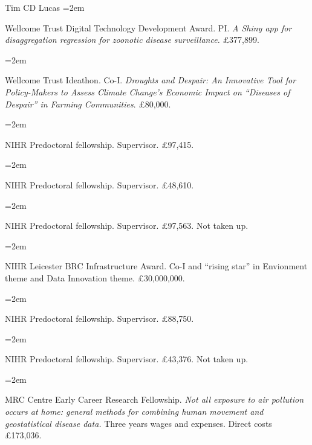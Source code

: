 \documentclass{scrartcl}
\newcommand{\MarginText}[1]{\marginpar{\raggedleft\itshape\small#1}} %
\newcommand{\Description}[1]{\hangindent=2em\hangafter=0\noindent\raggedright\footnotesize{#1}\par\normalsize\vspace{1em}} %
\begin{document}
\begin{cv}{Tim {\Large CD} Lucas}
\Description{\MarginText{2023}Wellcome Trust Digital Technology Development Award. PI. \emph{A Shiny app for disaggregation regression for zoonotic disease surveillance.} £377,899.}
\vspace{-0.5em} %


\Description{Wellcome Trust Ideathon. Co-I. \emph{Droughts and Despair: An Innovative Tool for Policy-Makers to Assess Climate Change's Economic Impact on ``Diseases of Despair'' in Farming Communities}. £80,000.}
\vspace{-0.5em} %

\Description{NIHR Predoctoral fellowship. Supervisor. £97,415.}
\vspace{-0.5em} %

\Description{NIHR Predoctoral fellowship. Supervisor. £48,610.}
\vspace{-0.5em} %

\Description{NIHR Predoctoral fellowship. Supervisor. £97,563. Not taken up.}
\vspace{-0.5em} %

\Description{\MarginText{2022}NIHR Leicester BRC Infrastructure Award. Co-I and ``rising star'' in Envionment theme and Data Innovation theme. £30,000,000.}
\vspace{-0.5em} %


\Description{NIHR Predoctoral fellowship. Supervisor. £88,750.}
\vspace{-0.5em} %

\Description{NIHR Predoctoral fellowship. Supervisor. £43,376. Not taken up.}
\vspace{-0.5em} %


\Description{\MarginText{2020}MRC Centre Early Career Research Fellowship. \emph{Not all exposure to air pollution occurs at home: general methods for combining human movement and geostatistical disease data.} Three years wages and expenses. Direct costs £173,036.}
\vspace{-0.5em} %



\end{cv}
\end{document}
